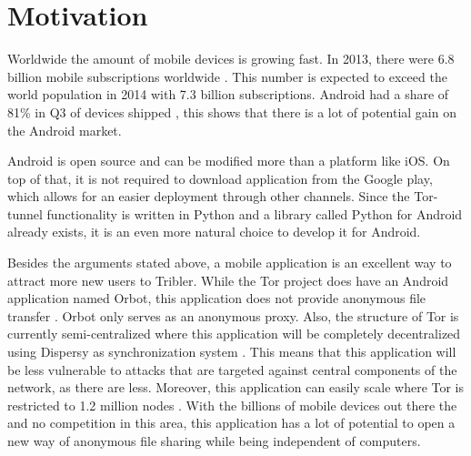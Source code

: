 \section{Motivation}
	\label{scc:motivation}
	Worldwide the amount of mobile devices is growing fast. In 2013, there were 6.8 billion mobile subscriptions worldwide \cite{itustatistics}. This number is expected to exceed the world population in 2014 with 7.3 billion subscriptions. Android had a share of 81\% in Q3 of devices shipped \cite{forbesandroidmarket}, this shows that there is a lot of potential gain on the Android market. 
	
	Android is open source and can be modified more than a platform like iOS. On top of that, it is not required to download application from the Google play, which allows for an easier deployment through other channels. Since the Tor-tunnel functionality is written in Python and a library called Python for Android already exists, it is an even more natural choice to develop it for Android.

	Besides the arguments stated above, a mobile application is an excellent way to attract more new users to Tribler. While the Tor project does have an Android application named Orbot, this application does not provide anonymous file transfer \cite{tororbot, googleplayorbot}. Orbot only serves as an anonymous proxy. Also, the structure of Tor is currently semi-centralized \cite{jagerman2014fifteen} where this application will be completely decentralized using Dispersy as synchronization system \cite{zeilemaker2013dispersy}. This means that this application will be less vulnerable to attacks that are targeted against central components of the network, as there are less. Moreover, this application can easily scale where Tor is restricted to 1.2 million nodes \cite{mclachlan2009scalable}. With the billions of mobile devices out there the and no competition in this area, this application has a lot of potential to open a new way of anonymous file sharing while being independent of computers.
	
